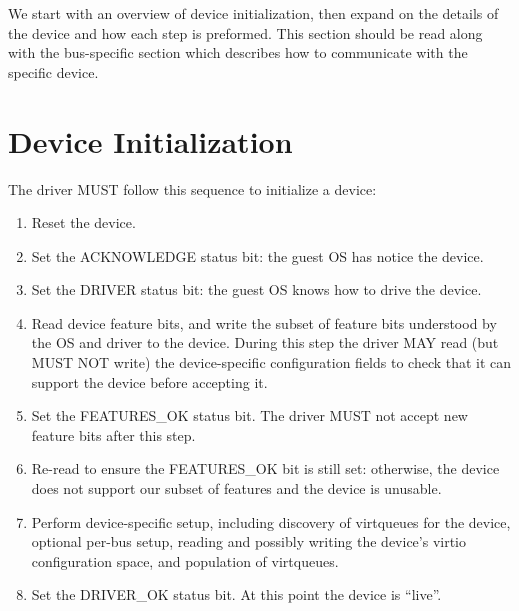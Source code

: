 We start with an overview of device initialization, then expand on the
details of the device and how each step is preformed.  This section
should be read along with the bus-specific section which describes
how to communicate with the specific device.

\section{Device Initialization}\label{sec:General Initialization And Device Operation / Device Initialization}

The driver MUST follow this sequence to initialize a device:

\begin{enumerate}
\item Reset the device.

\item Set the ACKNOWLEDGE status bit: the guest OS has notice the device.

\item Set the DRIVER status bit: the guest OS knows how to drive the device.

\item\label{itm:General Initialization And Device Operation /
Device Initialization / Read feature bits} Read device feature bits, and write the subset of feature bits
   understood by the OS and driver to the device.  During this step the
   driver MAY read (but MUST NOT write) the device-specific configuration fields to check that it can support the device before accepting it.

\item\label{itm:General Initialization And Device Operation / Device Initialization / Set FEATURES-OK} Set the FEATURES_OK status bit.  The driver MUST not accept
   new feature bits after this step.

\item\label{itm:General Initialization And Device Operation / Device Initialization / Re-read FEATURES-OK} Re-read  to ensure the FEATURES_OK bit is still
   set: otherwise, the device does not support our subset of features
   and the device is unusable.

\item\label{itm:General Initialization And Device Operation / Device Initialization / Device-specific Setup} Perform device-specific setup, including discovery of virtqueues for the
   device, optional per-bus setup, reading and possibly writing the
   device's virtio configuration space, and population of virtqueues.

\item\label{itm:General Initialization And Device Operation / Device Initialization / Set DRIVER-OK} Set the DRIVER_OK status bit.  At this point the device is
   ``live''.
\end{enumerate}

